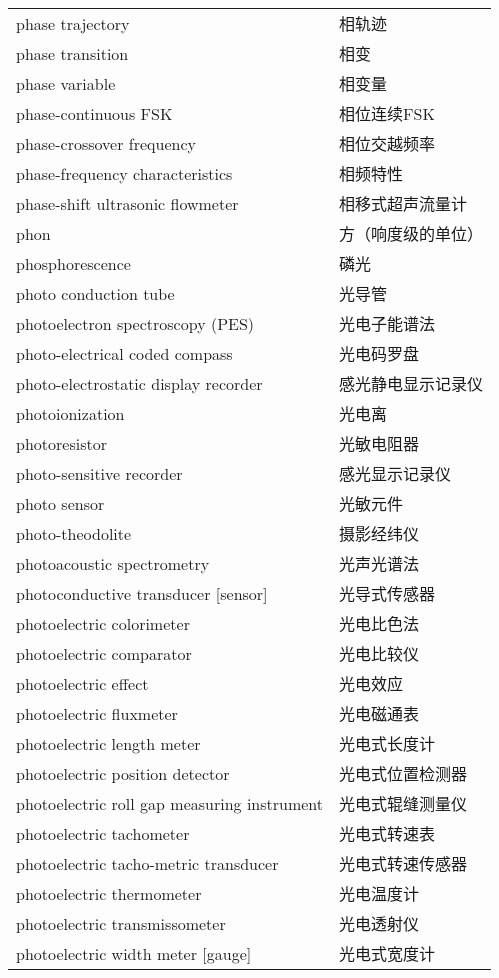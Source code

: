 \documentclass[
]{article}
\begin{document}
\begin{longtable}[]{@{}ll@{}}
phase trajectory & 相轨迹 \\
phase transition & 相变 \\
phase variable & 相变量 \\
phase-continuous FSK & 相位连续FSK \\
phase-crossover frequency & 相位交越频率 \\
phase-frequency characteristics & 相频特性 \\
phase-shift ultrasonic flowmeter & 相移式超声流量计 \\
phon & 方（响度级的单位） \\
phosphorescence & 磷光 \\
photo conduction tube & 光导管 \\
photoelectron spectroscopy (PES) & 光电子能谱法 \\
photo-electrical coded compass & 光电码罗盘 \\
photo-electrostatic display recorder & 感光静电显示记录仪 \\
photoionization & 光电离 \\
photoresistor & 光敏电阻器 \\
photo-sensitive recorder & 感光显示记录仪 \\
photo sensor & 光敏元件 \\
photo-theodolite & 摄影经纬仪 \\
photoacoustic spectrometry & 光声光谱法 \\
photoconductive transducer {[}sensor{]} & 光导式传感器 \\
photoelectric colorimeter & 光电比色法 \\
photoelectric comparator & 光电比较仪 \\
photoelectric effect & 光电效应 \\
photoelectric fluxmeter & 光电磁通表 \\
photoelectric length meter & 光电式长度计 \\
photoelectric position detector & 光电式位置检测器 \\
photoelectric roll gap measuring instrument & 光电式辊缝测量仪 \\
photoelectric tachometer & 光电式转速表 \\
photoelectric tacho-metric transducer & 光电式转速传感器 \\
photoelectric thermometer & 光电温度计 \\
photoelectric transmissometer & 光电透射仪 \\
photoelectric width meter {[}gauge{]} & 光电式宽度计 \\

\end{longtable}
\end{document}
